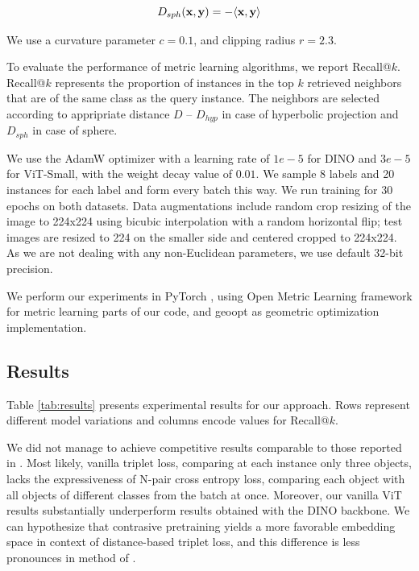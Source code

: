 \documentclass[10pt, letterpaper, twocolumn]{article}
\begin{document}
\begin{equation}\label{eq:dot}
    D_{sph}(\mathbf{x},\mathbf{y}) = - \langle \mathbf{x}, \mathbf{y} \rangle
\end{equation}

We use a curvature parameter $c = 0.1$, and clipping radius $r = 2.3$.

To evaluate the performance of metric learning algorithms, we report Recall@$k$. Recall@$k$ represents the proportion of instances in the top $k$ retrieved neighbors that are of the same class as the query instance. The neighbors are selected according to appripriate distance $D$ -- $D_{hyp}$ in case of hyperbolic projection and $D_{sph}$ in case of sphere.

We use the AdamW optimizer \cite{loshchilov_decoupled_2019} with a learning rate of $1e-5$ for DINO and $3e-5$ for ViT-Small, with the weight decay value of $0.01$. We sample 8 labels and 20 instances for each label and form every batch this way. We run training for 30 epochs on both datasets. Data augmentations include random crop resizing of the image to 224x224 using bicubic interpolation with a random horizontal flip; test images are resized to 224 on the smaller side and centered cropped to 224x224. As we are not dealing with any non-Euclidean parameters, we use default 32-bit precision.

We perform our experiments in PyTorch \cite{paszke_pytorch_2019}, using Open Metric Learning framework \cite{noauthor_oml-teamopen-metric-learning_2023} for metric learning parts of our code, and geoopt \cite{kochurov_geoopt_2020} as geometric optimization implementation.

\subsection{Results}

Table \ref{tab:results} presents experimental results for our approach. Rows represent different model variations and columns encode values for Recall@$k$.

We did not manage to achieve competitive results comparable to those reported in \cite{ermolov_hyperbolic_2022}. Most likely, vanilla triplet loss, comparing at each instance only three objects, lacks the expressiveness of N-pair cross entropy loss, comparing each object with all objects of different classes from the batch at once. Moreover, our vanilla ViT results substantially underperform results obtained with the DINO backbone. We can hypothesize that contrasive pretraining yields a more favorable embedding space in context of distance-based triplet loss, and this difference is less pronounces in method of \cite{ermolov_hyperbolic_2022}.
\end{document}
